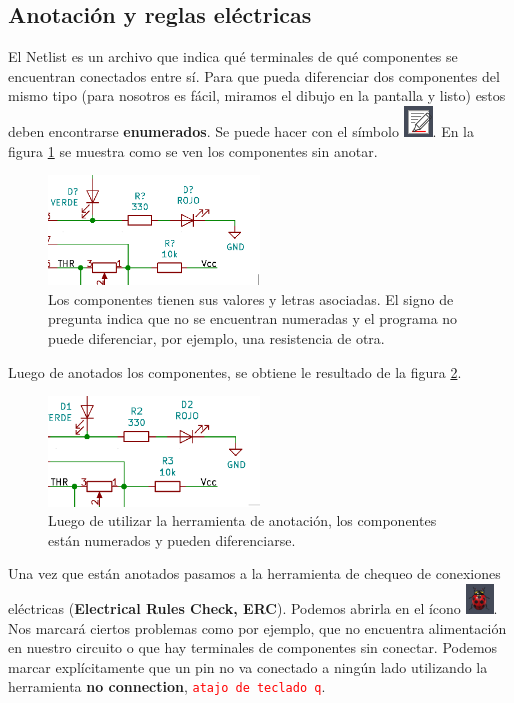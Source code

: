 \subsection{Anotación y reglas eléctricas}

El Netlist es un archivo que indica qué terminales de qué componentes se encuentran conectados entre sí. Para que pueda diferenciar dos componentes del mismo tipo (para nosotros es fácil, miramos el dibujo en la pantalla y listo) estos deben encontrarse \textbf{enumerados}. Se puede hacer con el símbolo \includegraphics[scale=0.5]{imagenes/herramienta_enumerar.png}. En la figura \ref{fig:sin_anotar} se muestra como se ven los componentes sin anotar.

\begin{figure}[H]
	\centering
	\includegraphics[width=0.5\textwidth]{imagenes/sin_anotar.png}
	\caption{Los componentes tienen sus valores y letras asociadas. El signo de pregunta indica que no se encuentran numeradas y el programa no puede diferenciar, por ejemplo, una resistencia de otra.}
	\label{fig:sin_anotar}
\end{figure}


Luego de anotados los componentes, se obtiene le resultado de la figura \ref{fig:anotados}.

\begin{figure}[H]
	\centering
	\includegraphics[width=0.5\textwidth]{imagenes/anotado.png}
	\caption{Luego de utilizar la herramienta de anotación, los componentes están numerados y pueden diferenciarse.}
	\label{fig:anotados}
\end{figure}

Una vez que están anotados pasamos a la herramienta de chequeo de conexiones eléctricas (\textbf{Electrical Rules Check, ERC}). Podemos abrirla en el ícono \includegraphics[scale=0.5]{imagenes/erc.png}. Nos marcará ciertos problemas como por ejemplo, que no encuentra alimentación en nuestro circuito o que hay terminales de componentes sin conectar. Podemos marcar explícitamente que un pin no va conectado a ningún lado utilizando la herramienta \textbf{no connection}, \textcolor{red}{\texttt{atajo de teclado q}}. 